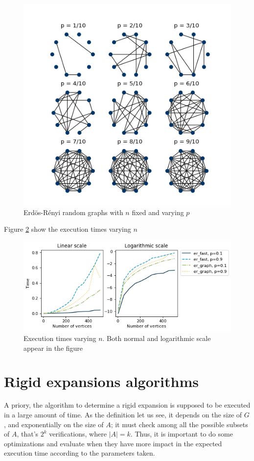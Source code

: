 \begin{figure}[h]
	\centering
	\includegraphics[scale=0.85]{Figures/ER-10.png}
	\caption{Erdös-Rényi random graphs with $n$ fixed and varying $p$}
	\label{fig:ErdosRenyi10}
\end{figure}

Figure \ref{fig:tiemposER} show the execution times varying $n$
\begin{figure}[h!]
	\centering
	\includegraphics[scale=0.7]{Python/Figures/Time-execution-er-generation-algoriths.png}
	\caption{Execution times varying $n$. Both normal and logarithmic scale appear in the figure}
	\label{fig:tiemposER}
\end{figure}

\section{Rigid expansions algorithms}
A priory, the algorithm to determine a rigid expansion is supposed to be executed in a large amount of time. As the definition let us see, it depends on the size of $G$, and exponentially on the size of $A$; it must check among all the possible subsets of $A$, that's $2^{k}$ verifications, where $|A|=k$. Thus, it is important to do some optimizations and evaluate when they have more impact in the expected execution time according to the parameters taken.

